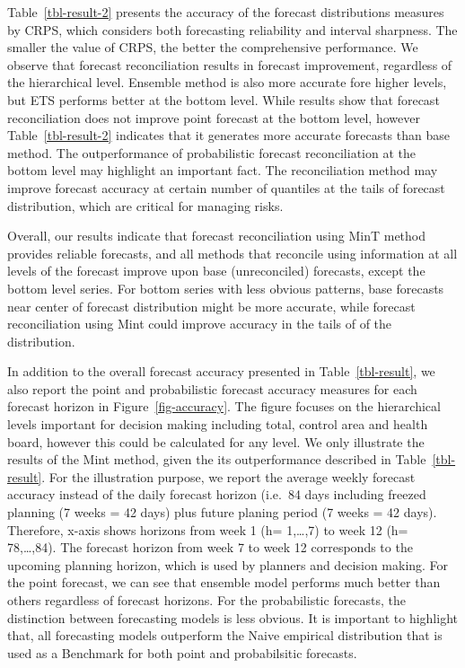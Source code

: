 \documentclass[
  authoryear,
  preprint,
  3p]{elsarticle}
\begin{document}
\begin{table}
\begin{minipage}[t]{\linewidth}
{}

\end{minipage}%

\end{table}

Table~\ref{tbl-result-2} presents the accuracy of the forecast
distributions measures by CRPS, which considers both forecasting
reliability and interval sharpness. The smaller the value of CRPS, the
better the comprehensive performance. We observe that forecast
reconciliation results in forecast improvement, regardless of the
hierarchical level. Ensemble method is also more accurate fore higher
levels, but ETS performs better at the bottom level. While results show
that forecast reconciliation does not improve point forecast at the
bottom level, however Table~\ref{tbl-result-2} indicates that it
generates more accurate forecasts than base method. The outperformance
of probabilistic forecast reconciliation at the bottom level may
highlight an important fact. The reconciliation method may improve
forecast accuracy at certain number of quantiles at the tails of
forecast distribution, which are critical for managing risks.

Overall, our results indicate that forecast reconciliation using MinT
method provides reliable forecasts, and all methods that reconcile using
information at all levels of the forecast improve upon base
(unreconciled) forecasts, except the bottom level series. For bottom
series with less obvious patterns, base forecasts near center of
forecast distribution might be more accurate, while forecast
reconciliation using Mint could improve accuracy in the tails of of the
distribution.

In addition to the overall forecast accuracy presented in
Table~\ref{tbl-result}, we also report the point and probabilistic
forecast accuracy measures for each forecast horizon in
Figure~\ref{fig-accuracy}. The figure focuses on the hierarchical levels
important for decision making including total, control area and health
board, however this could be calculated for any level. We only
illustrate the results of the Mint method, given the its outperformance
described in Table~\ref{tbl-result}. For the illustration purpose, we
report the average weekly forecast accuracy instead of the daily
forecast horizon (i.e.~84 days including freezed planning (7 weeks = 42
days) plus future planing period (7 weeks = 42 days). Therefore, x-axis
shows horizons from week 1 (h= 1,\ldots,7) to week 12 (h= 78,\ldots,84).
The forecast horizon from week 7 to week 12 corresponds to the upcoming
planning horizon, which is used by planners and decision making. For the
point forecast, we can see that ensemble model performs much better than
others regardless of forecast horizons. For the probabilistic forecasts,
the distinction between forecasting models is less obvious. It is
important to highlight that, all forecasting models outperform the Naive
empirical distribution that is used as a Benchmark for both point and
probabilsitic forecasts.
\end{document}
